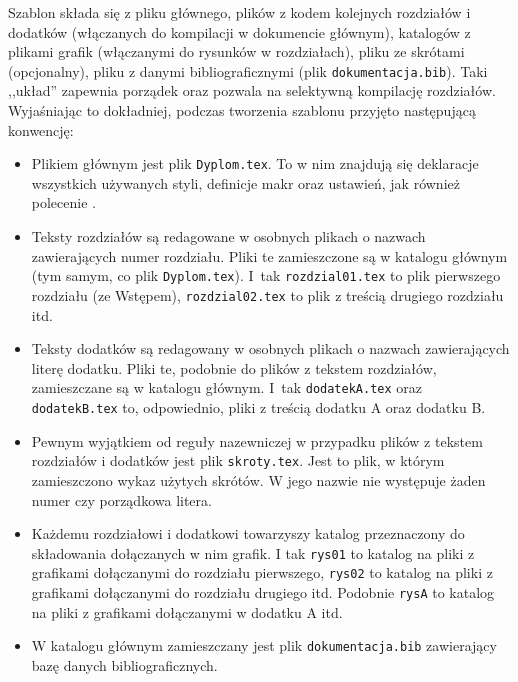 Szablon składa się z pliku głównego, plików z kodem kolejnych rozdziałów i dodatków (włączanych do kompilacji w dokumencie głównym), katalogów z plikami grafik (włączanymi do rysunków w rozdziałach), pliku ze skrótami (opcjonalny), pliku z danymi bibliograficznymi (plik \texttt{dokumentacja.bib}). Taki ,,układ'' zapewnia porządek oraz pozwala na selektywną kompilację rozdziałów. Wyjaśniając to dokładniej, podczas tworzenia szablonu przyjęto następującą konwencję:
\begin{itemize}
\item Plikiem głównym jest plik \texttt{Dyplom.tex}. To w nim znajdują się deklaracje wszystkich używanych styli, definicje makr oraz ustawień, jak również polecenie \verb++.
\item Teksty rozdziałów są redagowane w osobnych plikach o nazwach zawierających numer rozdziału. Pliki te zamieszczone są w katalogu głównym (tym samym, co plik \texttt{Dyplom.tex}). I~tak \texttt{rozdzial01.tex} to plik pierwszego rozdziału (ze Wstępem), \texttt{rozdzial02.tex} to plik z treścią drugiego rozdziału itd. 
\item Teksty dodatków są redagowany w osobnych plikach o nazwach zawierających literę dodatku. Pliki te, podobnie do plików z tekstem rozdziałów, zamieszczane są w katalogu głównym. I~tak \texttt{dodatekA.tex} oraz \texttt{dodatekB.tex} to, odpowiednio, pliki z treścią dodatku A oraz dodatku B.
\item Pewnym wyjątkiem od reguły nazewniczej w przypadku plików z tekstem rozdziałów i dodatków jest plik \texttt{skroty.tex}. Jest to plik, w którym zamieszczono wykaz użytych skrótów. W jego nazwie nie występuje żaden numer czy porządkowa litera. 
\item Każdemu rozdziałowi i dodatkowi towarzyszy katalog przeznaczony do składowania dołączanych w nim grafik. I tak \texttt{rys01} to katalog na pliki z grafikami dołączanymi do rozdziału pierwszego, \texttt{rys02} to katalog na pliki z grafikami dołączanymi do rozdziału drugiego itd.
Podobnie \texttt{rysA} to katalog na pliki z grafikami dołączanymi w dodatku A itd.
\item W katalogu głównym zamieszczany jest plik \texttt{dokumentacja.bib} zawierający bazę danych bibliograficznych.
\end{itemize}

